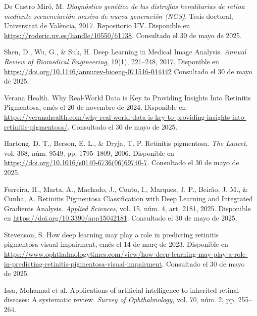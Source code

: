 \documentclass[11pt,spanish,listoffigures,listoftables]{tfgetsinf}
\begin{document}
\begin{thebibliography}{99}
   De Castro Miró, M.  
   \newblock \textit{Diagnóstico genético de las distrofias hereditarias de retina mediante secuenciación masiva de nueva generación (NGS)}.  
   \newblock Tesis doctoral, Universitat de València, 2017.  
   \newblock Repositorio UV.  
   \newblock Disponible en
   \newblock \url{https://roderic.uv.es/handle/10550/61138}.
   \newblock Consultado el 30 de mayo de 2025.

   Shen, D., Wu, G., \& Suk, H.
   \newblock Deep Learning in Medical Image Analysis.
   \newblock \textit{Annual Review of Biomedical Engineering}, 19(1), 221--248, 2017.
   \newblock Disponible en
   \newblock \url{https://doi.org/10.1146/annurev-bioeng-071516-044442}
   \newblock Consultado el 30 de mayo de 2025.

   Verana Health.  
   \newblock Why Real-World Data is Key to Providing Insights Into Retinitis Pigmentosa,  
   emés el 20 de novembre de 2024.  
   \newblock Disponible en  
   \url{https://veranahealth.com/why-real-world-data-is-key-to-providing-insights-into-retinitis-pigmentosa/}.
   \newblock Consultado el 30 de mayo de 2025.

   Hartong, D. T., Berson, E. L., \& Dryja, T. P.  
   \newblock Retinitis pigmentosa.  
   \newblock \textit{The Lancet}, vol. 368, núm. 9549, pp. 1795--1809, 2006.  
   \newblock Disponible en  
   \url{https://doi.org/10.1016/s0140-6736(06)69740-7}.
   \newblock Consultado el 30 de mayo de 2025.

   Ferreira, H., Marta, A., Machado, J., Couto, I., Marques, J. P., Beirão, J. M., \& Cunha, A.  
   \newblock Retinitis Pigmentosa Classification with Deep Learning and Integrated Gradients Analysis.  
   \newblock \textit{Applied Sciences}, vol. 15, núm. 4, art. 2181, 2025.  
   \newblock Disponible en  
   \url{https://doi.org/10.3390/app15042181}.
   \newblock Consultado el 30 de mayo de 2025.

   Stevenson, S.  
   \newblock How deep learning may play a role in predicting retinitis pigmentosa visual impairment,  
   emés el 14 de març de 2023.  
   \newblock Disponible en  
   \url{https://www.ophthalmologytimes.com/view/how-deep-learning-may-play-a-role-in-predicting-retinitis-pigmentosa-visual-impairment}.
   \newblock Consultado el 30 de mayo de 2025.

   Issa, Mohamad et al.  
   \newblock Applications of artificial intelligence to inherited retinal diseases: A systematic review.  
   \newblock \textit{Survey of Ophthalmology}, vol. 70, núm. 2, pp. 255--264.  


\end{thebibliography}
\end{document}
